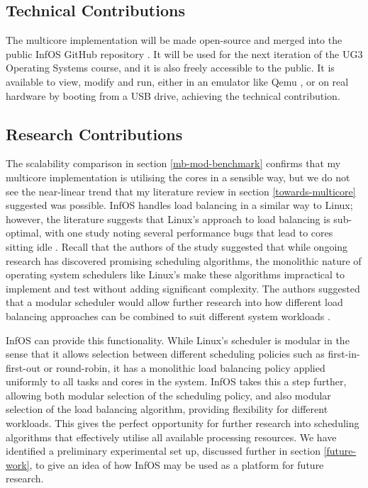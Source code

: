 \documentclass[bsc,frontabs,singlespacing,parskip,deptreport]{infthesis}
\begin{document}
\subsection{Technical Contributions}
The multicore implementation will be made open-source and merged into the public InfOS GitHub repository \cite{infos}. It will be used for the next iteration of the UG3 Operating Systems course, and it is also freely accessible to the public. It is available to view, modify and run, either in an emulator like Qemu \cite{qemu}, or on real hardware by booting from a USB drive, achieving the technical contribution.

\subsection{Research Contributions}
The scalability comparison in section \ref{mb-mod-benchmark} confirms that my multicore implementation is utilising the cores in a sensible way, but we do not see the near-linear trend that my literature review in section \ref{towards-multicore} suggested was possible. InfOS handles load balancing in a similar way to Linux; however, the literature suggests that Linux's approach to load balancing is sub-optimal, with one study noting several performance bugs that lead to cores sitting idle \cite{wasted-cores}. Recall that the authors of the study suggested that  while ongoing research has discovered promising scheduling algorithms, the monolithic nature of operating system schedulers like Linux's make these algorithms impractical to implement and test without adding significant complexity. The authors suggested that a modular scheduler would allow further research into how different load balancing approaches can be combined to suit different system workloads \cite{wasted-cores}.

InfOS can provide this functionality. While Linux's scheduler is modular in the sense that it allows selection between different scheduling policies such as first-in-first-out or round-robin, it has a monolithic load balancing policy applied uniformly to all tasks and cores in the system. InfOS takes this a step further, allowing both modular selection of the scheduling policy, and also modular selection of the load balancing algorithm, providing flexibility for different workloads. This gives the perfect opportunity for further research into scheduling algorithms that effectively utilise all available processing resources. We have identified a preliminary experimental set up, discussed further in section \ref{future-work}, to give an idea of how InfOS may be used as a platform for future research.
\end{document}
